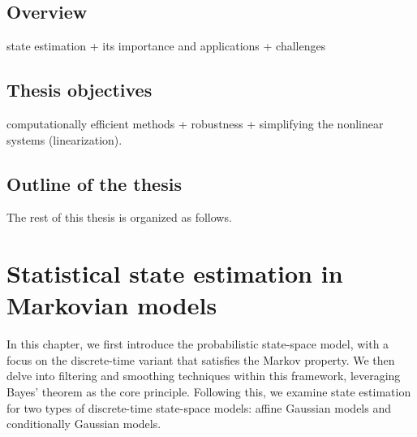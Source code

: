 \documentclass[dissertation,math,vertlayout,pdfa,colorlinks,nologo]{aaltoseries}
\begin{document}
\section{Overview}
\label{sec:overview}
state estimation + its importance and applications + challenges


\section{Thesis objectives}
\label{sec:objectives}

computationally efficient methods + robustness + simplifying the nonlinear systems (linearization).

\section{Outline of the thesis}
\label{sec:outline}
The rest of this thesis is organized as follows.


\chapter{Statistical state estimation in Markovian models}
\label{ch:nonlinear-fs}
In this chapter, we first introduce the probabilistic state-space model, with a focus on the discrete-time variant that satisfies the Markov property. We then delve into filtering and smoothing techniques within this framework, leveraging Bayes' theorem as the core principle. Following this, we examine state estimation for two types of discrete-time state-space models: affine Gaussian models and conditionally Gaussian models.
\end{document}
